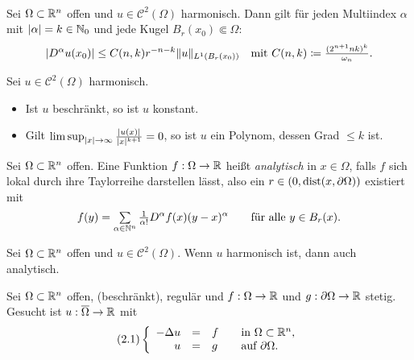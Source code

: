 \documentclass{cheat-sheet}
\DeclareMathOperator{\dist}{dist} %
\begin{document}
\begin{satz}\mbox{}\\
  Sei $\Omega \subset \mathbb{R}^n$ offen und $u \in \mathcal{C}^2(\Omega)$ harmonisch. Dann gilt für jeden Multiindex $\alpha$ mit $\lvert\alpha\rvert = k \in \mathbb{N}_0$ und jede Kugel $B_r(x_0) \Subset \Omega$:
  \[
    \lvert D^\alpha u(x_0)\rvert \leq C(n, k) r^{-n-k} \lVert u\rVert_{L^1(B_r(x_0))}
    \quad \text{mit } C(n, k) \coloneqq \tfrac{(2^{n+1} nk)^k}{\omega_n}.
  \]
\end{satz}

\begin{satz}[Liouville]
  Sei $u \in \mathcal{C}^2(\Omega)$ harmonisch.
  \begin{itemize}
    \item Ist $u$ beschränkt, so ist $u$ konstant.
    \item Gilt $\limsup_{\lvert x\rvert \to \infty} \tfrac{\lvert u(x)\rvert}{\lvert x\rvert^{k+1}} = 0$, so ist $u$ ein Polynom, dessen Grad $\leq k$ ist.
  \end{itemize}
\end{satz}

\begin{defn}
  Sei $\Omega \subset \mathbb{R}^n$ offen. Eine Funktion $f : \Omega \to \mathbb{R}$ heißt \emph{analytisch} in $x \in \Omega$, falls $f$ sich lokal durch ihre Taylorreihe darstellen lässt, also ein $r \in \ointerval{0}{\dist(x, \partial \Omega)}$ existiert mit
  \[
    f(y) = \sum_{\alpha \in \N^n} \tfrac{1}{\alpha!} D^\alpha f(x) (y-x)^\alpha
    \qquad \text{für alle $y \in B_r(x)$.}
  \]
\end{defn}

\begin{satz}
  Sei $\Omega \subset \mathbb{R}^n$ offen und $u \in \mathcal{C}^2(\Omega)$. Wenn $u$ harmonisch ist, dann auch analytisch.
\end{satz}


\begin{prob}
  Sei $\Omega \subset \mathbb{R}^n$ offen, (beschränkt), regulär und $f : \Omega \to \mathbb{R}$ und $g : \partial \Omega \to \mathbb{R}$ stetig. Gesucht ist $u : \overline{\Omega} \to \mathbb{R}$ mit
  \[
    (2.1) \left\{ \begin{array}{rlll}
      - \Delta u &=& f &\quad \text{in $\Omega \subset \mathbb{R}^n$,}\\
      u &=& g &\quad \text{auf $\partial \Omega$.}
    \end{array} \right.
  \]
\end{prob}
\end{document}
